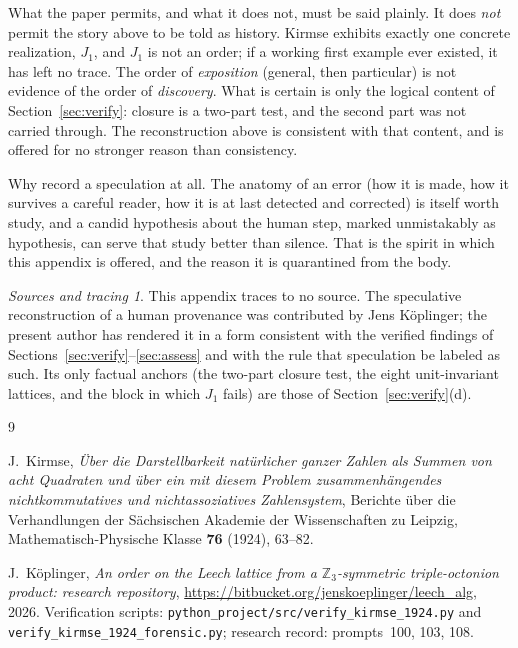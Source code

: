 \documentclass[11pt]{amsart}
\newcommand{\ZZ}{\mathbb{Z}}
\numberwithin{equation}{section}
\theoremstyle{definition}
\theoremstyle{plain}
\theoremstyle{remark}
\newtheorem*{tracing}{Sources and tracing}
\begin{document}
What the paper permits, and what it does not, must be said plainly.  It does
\emph{not} permit the story above to be told as history.  Kirmse exhibits
exactly one concrete realization, $J_1$, and $J_1$ is not an order; if a
working first example ever existed, it has left no trace.  The order of
\emph{exposition} (general, then particular) is not evidence of the
order of \emph{discovery}.  What is certain is only the logical content of
Section~\ref{sec:verify}: closure is a two-part test, and the second part was
not carried through.  The reconstruction above is consistent with that
content, and is offered for no stronger reason than consistency.

Why record a speculation at all.  The anatomy of an error (how it is
made, how it survives a careful reader, how it is at last detected and
corrected) is itself worth study, and a candid hypothesis about the human
step, marked unmistakably as hypothesis, can serve that study better than
silence.  That is the spirit in which this appendix is offered, and the
reason it is quarantined from the body.

\begin{tracing}
This appendix traces to no source.  The speculative reconstruction of a human
provenance was contributed by Jens K\"oplinger; the present author has
rendered it in a form consistent with the verified findings of
Sections~\ref{sec:verify}--\ref{sec:assess} and with the rule that
speculation be labeled as such.  Its only factual anchors (the two-part
closure test, the eight unit-invariant lattices, and the block in which
$J_1$ fails) are those of Section~\ref{sec:verify}(d).
\end{tracing}

\begin{thebibliography}{9}

J.~Kirmse,
\emph{\"Uber die Darstellbarkeit nat\"urlicher ganzer Zahlen als Summen von
acht Quadraten und \"uber ein mit diesem Problem zusammenh\"angendes
nichtkommutatives und nichtassoziatives Zahlensystem},
Berichte \"uber die Verhandlungen der S\"achsischen Akademie der
Wissenschaften zu Leipzig, Mathematisch-Physische Klasse \textbf{76} (1924),
63--82.

J.~K\"oplinger,
\emph{An order on the Leech lattice from a $\ZZ_3$-symmetric triple-octonion
product: research repository},
\url{https://bitbucket.org/jenskoeplinger/leech_alg}, 2026.
Verification scripts: \texttt{python\_project/src/verify\_kirmse\_1924.py}
and \texttt{verify\_kirmse\_1924\_forensic.py};
research record: prompts~100, 103, 108.

\end{thebibliography}
\end{document}

